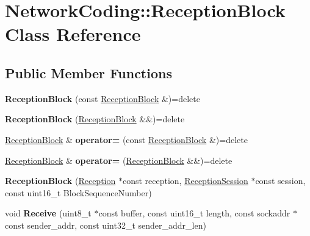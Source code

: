 \hypertarget{class_network_coding_1_1_reception_block}{}\section{Network\+Coding\+:\+:Reception\+Block Class Reference}
\label{class_network_coding_1_1_reception_block}
\subsection*{Public Member Functions}
\begin{DoxyCompactItemize}
\item 
{\bfseries Reception\+Block} (const \hyperlink{class_network_coding_1_1_reception_block}{Reception\+Block} \&)=delete\hypertarget{class_network_coding_1_1_reception_block_ab2ddf47c1360c4551a204480c33b4ad1}{}\label{class_network_coding_1_1_reception_block_ab2ddf47c1360c4551a204480c33b4ad1}

\item 
{\bfseries Reception\+Block} (\hyperlink{class_network_coding_1_1_reception_block}{Reception\+Block} \&\&)=delete\hypertarget{class_network_coding_1_1_reception_block_a626c34996888a2fb98c52d64938ac60c}{}\label{class_network_coding_1_1_reception_block_a626c34996888a2fb98c52d64938ac60c}

\item 
\hyperlink{class_network_coding_1_1_reception_block}{Reception\+Block} \& {\bfseries operator=} (const \hyperlink{class_network_coding_1_1_reception_block}{Reception\+Block} \&)=delete\hypertarget{class_network_coding_1_1_reception_block_a678b299cebefbc366fcce9cca3f2cd45}{}\label{class_network_coding_1_1_reception_block_a678b299cebefbc366fcce9cca3f2cd45}

\item 
\hyperlink{class_network_coding_1_1_reception_block}{Reception\+Block} \& {\bfseries operator=} (\hyperlink{class_network_coding_1_1_reception_block}{Reception\+Block} \&\&)=delete\hypertarget{class_network_coding_1_1_reception_block_a0c0b09d88ce90b3d8dcbb45609c63d11}{}\label{class_network_coding_1_1_reception_block_a0c0b09d88ce90b3d8dcbb45609c63d11}

\item 
{\bfseries Reception\+Block} (\hyperlink{class_network_coding_1_1_reception}{Reception} $\ast$const reception, \hyperlink{class_network_coding_1_1_reception_session}{Reception\+Session} $\ast$const session, const uint16\+\_\+t Block\+Sequence\+Number)\hypertarget{class_network_coding_1_1_reception_block_a3d597dff980e67ef390814aa68dc4c34}{}\label{class_network_coding_1_1_reception_block_a3d597dff980e67ef390814aa68dc4c34}

\item 
void {\bfseries Receive} (uint8\+\_\+t $\ast$const buffer, const uint16\+\_\+t length, const sockaddr $\ast$const sender\+\_\+addr, const uint32\+\_\+t sender\+\_\+addr\+\_\+len)\hypertarget{class_network_coding_1_1_reception_block_a2a316e074d767a80fdf7838b372d4bca}{}\label{class_network_coding_1_1_reception_block_a2a316e074d767a80fdf7838b372d4bca}

\end{DoxyCompactItemize}
